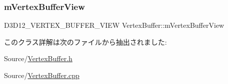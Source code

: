 \mbox{\label{class_vertex_buffer_a42f71aacaf7c1da89bcb729e3f6cf091}} 
\subsubsection{\texorpdfstring{m\+Vertex\+Buffer\+View}{mVertexBufferView}}
{\footnotesize\ttfamily D3\+D12\+\_\+\+V\+E\+R\+T\+E\+X\+\_\+\+B\+U\+F\+F\+E\+R\+\_\+\+V\+I\+EW Vertex\+Buffer\+::m\+Vertex\+Buffer\+View\hspace{0.3cm}{\ttfamily [protected]}}



このクラス詳解は次のファイルから抽出されました\+:\begin{DoxyCompactItemize}
\item 
Source/\mbox{\hyperlink{_vertex_buffer_8h}{Vertex\+Buffer.\+h}}\item 
Source/\mbox{\hyperlink{_vertex_buffer_8cpp}{Vertex\+Buffer.\+cpp}}\end{DoxyCompactItemize}
